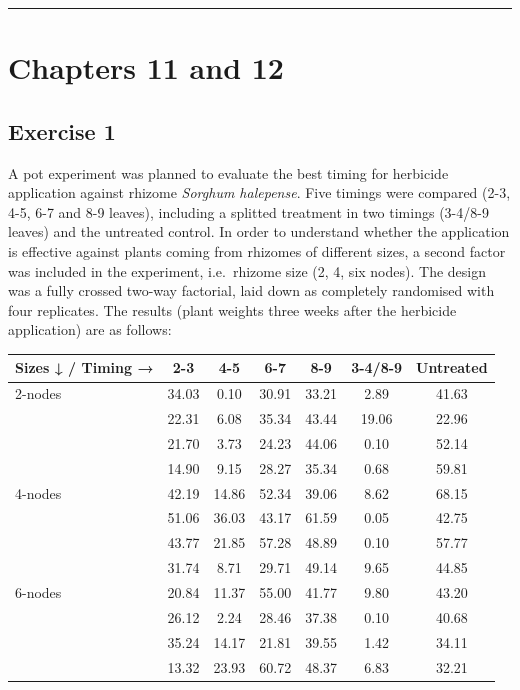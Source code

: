 \documentclass[a4paper,12pt,oneside]{book}
\begin{document}
\begin{center}\rule{0.5\linewidth}{0.5pt}\end{center}

\hypertarget{chapters-11-and-12}{%
\section{Chapters 11 and 12}\label{chapters-11-and-12}}

\hypertarget{exercise-1-6}{%
\subsection{Exercise 1}\label{exercise-1-6}}

A pot experiment was planned to evaluate the best timing for herbicide application against rhizome \emph{Sorghum halepense}. Five timings were compared (2-3, 4-5, 6-7 and 8-9 leaves), including a splitted treatment in two timings (3-4/8-9 leaves) and the untreated control. In order to understand whether the application is effective against plants coming from rhizomes of different sizes, a second factor was included in the experiment, i.e.~rhizome size (2, 4, six nodes). The design was a fully crossed two-way factorial, laid down as completely randomised with four replicates. The results (plant weights three weeks after the herbicide application) are as follows:

\begin{longtable}[]{@{}lcccccc@{}}
\toprule
Sizes ↓ / Timing → & 2-3 & 4-5 & 6-7 & 8-9 & 3-4/8-9 & Untreated \\
\midrule
\endhead
2-nodes & 34.03 & 0.10 & 30.91 & 33.21 & 2.89 & 41.63 \\
& 22.31 & 6.08 & 35.34 & 43.44 & 19.06 & 22.96 \\
& 21.70 & 3.73 & 24.23 & 44.06 & 0.10 & 52.14 \\
& 14.90 & 9.15 & 28.27 & 35.34 & 0.68 & 59.81 \\
4-nodes & 42.19 & 14.86 & 52.34 & 39.06 & 8.62 & 68.15 \\
& 51.06 & 36.03 & 43.17 & 61.59 & 0.05 & 42.75 \\
& 43.77 & 21.85 & 57.28 & 48.89 & 0.10 & 57.77 \\
& 31.74 & 8.71 & 29.71 & 49.14 & 9.65 & 44.85 \\
6-nodes & 20.84 & 11.37 & 55.00 & 41.77 & 9.80 & 43.20 \\
& 26.12 & 2.24 & 28.46 & 37.38 & 0.10 & 40.68 \\
& 35.24 & 14.17 & 21.81 & 39.55 & 1.42 & 34.11 \\
& 13.32 & 23.93 & 60.72 & 48.37 & 6.83 & 32.21 \\
\bottomrule
\end{longtable}
\end{document}
